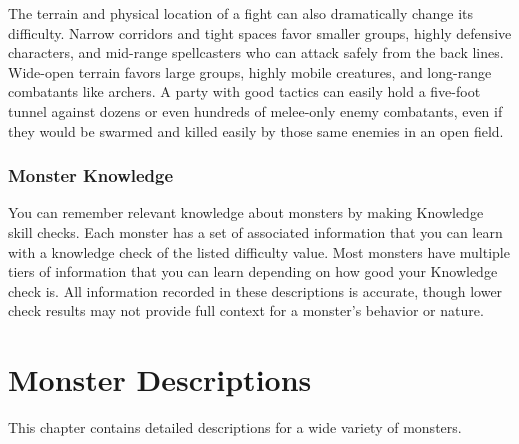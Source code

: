     The terrain and physical location of a fight can also dramatically change its difficulty.
    Narrow corridors and tight spaces favor smaller groups, highly defensive characters, and mid-range spellcasters who can attack safely from the back lines.
    Wide-open terrain favors large groups, highly mobile creatures, and long-range combatants like archers.
    A party with good tactics can easily hold a five-foot tunnel against dozens or even hundreds of melee-only enemy combatants, even if they would be swarmed and killed easily by those same enemies in an open field.

  \subsection{Monster Knowledge}
    You can remember relevant knowledge about monsters by making Knowledge skill checks.
    Each monster has a set of associated information that you can learn with a knowledge check of the listed difficulty value.
    Most monsters have multiple tiers of information that you can learn depending on how good your Knowledge check is.
    All information recorded in these descriptions is accurate, though lower check results may not provide full context for a monster's behavior or nature.



%   

\chapter{Monster Descriptions}

  This chapter contains detailed descriptions for a wide variety of monsters.

  
